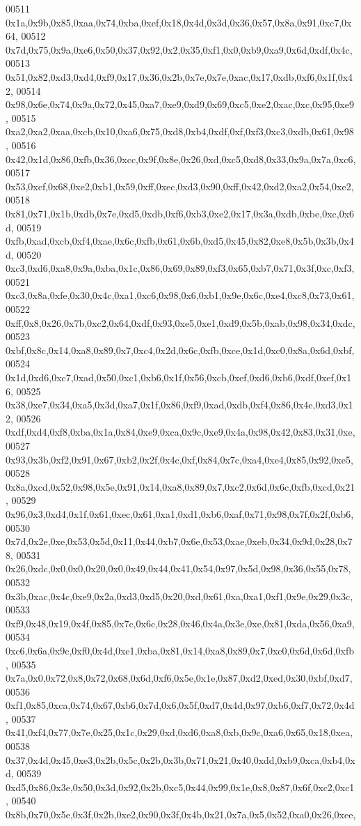 \begin{DoxyCode}
00511   0x1a,0x9b,0x85,0xaa,0x74,0xba,0xef,0x18,0x4d,0x3d,0x36,0x57,0x8a,0x91,0xc7,0x64,
00512   0x7d,0x75,0x9a,0xe6,0x50,0x37,0x92,0x2,0x35,0xf1,0x0,0xb9,0xa9,0x6d,0xdf,0x4c,
00513   0x51,0x82,0xd3,0xd4,0xf9,0x17,0x36,0x2b,0x7e,0x7e,0xac,0x17,0xdb,0xf6,0x1f,0x42,
00514   0x98,0x6e,0x74,0x9a,0x72,0x45,0xa7,0xe9,0xd9,0x69,0xc5,0xe2,0xac,0xc,0x95,0xe9,
00515   0xa2,0xa2,0xaa,0xcb,0x10,0xa6,0x75,0xd8,0xb4,0xdf,0xf,0xf3,0xc3,0xdb,0x61,0x98,
00516   0x42,0x1d,0x86,0xfb,0x36,0xcc,0x9f,0x8e,0x26,0xd,0xc5,0xd8,0x33,0x9a,0x7a,0xc6,
00517   0x53,0xcf,0x68,0xe2,0xb1,0x59,0xff,0xec,0xd3,0x90,0xff,0x42,0xd2,0xa2,0x54,0xe2,
00518   0x81,0x71,0x1b,0xdb,0x7e,0xd5,0xdb,0xf6,0xb3,0xe2,0x17,0x3a,0xdb,0xbe,0xc,0x6d,
00519   0xfb,0xad,0xcb,0xf4,0xae,0x6c,0xfb,0x61,0x6b,0xd5,0x45,0x82,0xe8,0x5b,0x3b,0x4d,
00520   0xc3,0xd6,0xa8,0x9a,0xba,0x1c,0x86,0x69,0x89,0xf3,0x65,0xb7,0x71,0x3f,0xc,0xf3,
00521   0xc3,0x8a,0xfe,0x30,0x4c,0xa1,0xc6,0x98,0x6,0xb1,0x9e,0x6c,0xe4,0xc8,0x73,0x61,
00522   0xff,0x8,0x26,0x7b,0xc2,0x64,0xdf,0x93,0xe5,0xe1,0xd9,0x5b,0xab,0x98,0x34,0xdc,
00523   0xbf,0x8c,0x14,0xa8,0x89,0x7,0xc4,0x2d,0x6c,0xfb,0xce,0x1d,0xc0,0x8a,0x6d,0xbf,
00524   0x1d,0xd6,0xc7,0xad,0x50,0xc1,0xb6,0x1f,0x56,0xcb,0xef,0xd6,0xb6,0xdf,0xef,0x16,
00525   0x38,0xe7,0x34,0xa5,0x3d,0xa7,0x1f,0x86,0xf9,0xad,0xdb,0xf4,0x86,0x4e,0xd3,0x12,
00526   0xdf,0xd4,0xf8,0xba,0x1a,0x84,0xe9,0xca,0x9c,0xe9,0x4a,0x98,0x42,0x83,0x31,0xe,
00527   0x93,0x3b,0xf2,0x91,0x67,0xb2,0x2f,0x4c,0xf,0x84,0x7c,0xa4,0xe4,0x85,0x92,0xe5,
00528   0x8a,0xcd,0x52,0x98,0x5e,0x91,0x14,0xa8,0x89,0x7,0xc2,0x6d,0x6c,0xfb,0xcd,0x21,
00529   0x96,0x3,0xd4,0x1f,0x61,0xec,0x61,0xa1,0xd1,0xb6,0xaf,0x71,0x98,0x7f,0x2f,0xb6,
00530   0x7d,0x2e,0xe,0x53,0x5d,0x11,0x44,0xb7,0x6e,0x53,0xae,0xeb,0x34,0x9d,0x28,0x78,
00531   0x26,0xdc,0x0,0x0,0x20,0x0,0x49,0x44,0x41,0x54,0x97,0x5d,0x98,0x36,0x55,0x78,
00532   0x3b,0xac,0x4c,0xe9,0x2a,0xd3,0xd5,0x20,0xd,0x61,0xa,0xa1,0xf1,0x9e,0x29,0x3c,
00533   0xf9,0x48,0x19,0x4f,0x85,0x7c,0x6c,0x28,0x46,0x4a,0x3e,0xe,0x81,0xda,0x56,0xa9,
00534   0xc6,0x6a,0x9c,0xf0,0x4d,0xe1,0xba,0x81,0x14,0xa8,0x89,0x7,0xc0,0x6d,0x6d,0xfb,
00535   0x7a,0x0,0x72,0x8,0x72,0x68,0x6d,0xf6,0x5e,0x1e,0x87,0xd2,0xed,0x30,0xbf,0xd7,
00536   0xf1,0x85,0xca,0x74,0x67,0xb6,0x7d,0x6,0x5f,0xd7,0x4d,0x97,0xb6,0xf7,0x72,0x4d,
00537   0x41,0xf4,0x77,0x7e,0x25,0x1c,0x29,0xd,0xd6,0xa8,0xb,0x9c,0xa6,0x65,0x18,0xea,
00538   0x37,0x4d,0x45,0xe3,0x2b,0x5c,0x2b,0x3b,0x71,0x21,0x40,0xdd,0xb9,0xca,0xb4,0xd,
00539   0xd5,0x86,0x3e,0x50,0x3d,0x92,0x2b,0xc5,0x44,0x99,0x1e,0x8,0x87,0x6f,0xc2,0xc1,
00540   0x8b,0x70,0x5e,0x3f,0x2b,0xe2,0x90,0x3f,0x4b,0x21,0x7a,0x5,0x52,0xa0,0x26,0xee,

\end{DoxyCode}
